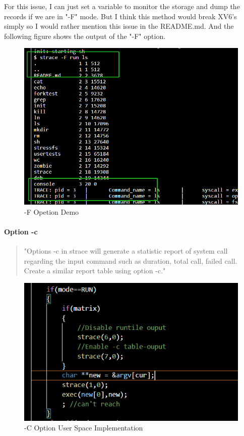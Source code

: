 \documentclass[11pt,oneside,a4paper]{article}
\begin{document}
For this issue, I can just set a variable to monitor the storage and dump the records if 
we are in "-F" mode. But I think this method would break XV6's simply so I would rather 
mention this issue in the README.md. And the following figure shows the output of the "-F" option.

\begin{figure}[H]
    \includegraphics[width=4.75in]{1-25.png}
    \centering
    \caption{-F Opetion Demo}
\end{figure}

\paragraph*{Option -c}
\begin{quotation}
    "Options -c in strace will generate a statistic report of system call regarding the input command
    such as duration, total call, failed call. Create a similar report table using option -c."
\end{quotation}

\begin{figure}[H]
    \includegraphics[width=4.75in]{1-37.png}
    \centering
    \caption{-C Option User Space Implementation}
\end{figure}
\end{document}
